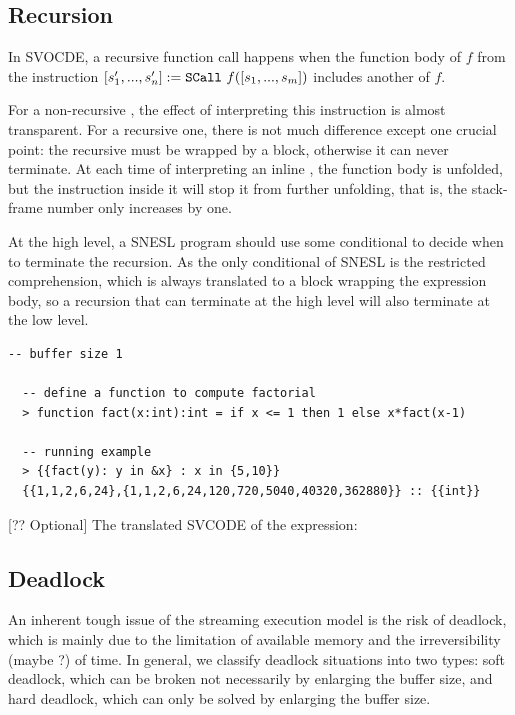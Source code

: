 \subsection{Recursion}

In SVOCDE, a recursive function call happens when the function body of $f$ from the instruction $\scall{f}{[s_1,...,s_m]}{[s_1',...,s_n']}$ includes another \sc of  $f$.

For a non-recursive \sc, the effect of interpreting this instruction is almost transparent. 
For a recursive one, there is not much difference except one crucial point: the recursive \sc must be wrapped by a \wc block, otherwise it can never terminate.
At each time of interpreting an inline \sc, the function body is unfolded, but the \wc instruction inside it will stop it from further unfolding, that is, the stack-frame number only increases by one. 

At the high level, a SNESL program should use some conditional to decide when to terminate the recursion. 
As the only conditional of SNESL is the restricted comprehension, which is always translated to a \wc block wrapping the expression body,
so a recursion that can terminate at the high level will also terminate at the low level. 


\begin{example}
\end{example}
\begin{lstlisting}[style=nesl-style]
  -- buffer size 1
  
  -- define a function to compute factorial
  > function fact(x:int):int = if x <= 1 then 1 else x*fact(x-1)
  
  -- running example
  > {{fact(y): y in &x} : x in {5,10}}
  {{1,1,2,6,24},{1,1,2,6,24,120,720,5040,40320,362880}} :: {{int}}
\end{lstlisting}


%

[?? Optional] The translated SVCODE of the expression:




\subsection{Deadlock}
An inherent tough issue of the streaming execution model is the risk of deadlock, which is mainly due to the limitation of available memory and the irreversibility (maybe ?) of time.
In general, we classify deadlock situations into two types: soft deadlock, which can be broken not necessarily by enlarging the buffer size, and hard deadlock, which can only be solved by enlarging the buffer size. 


